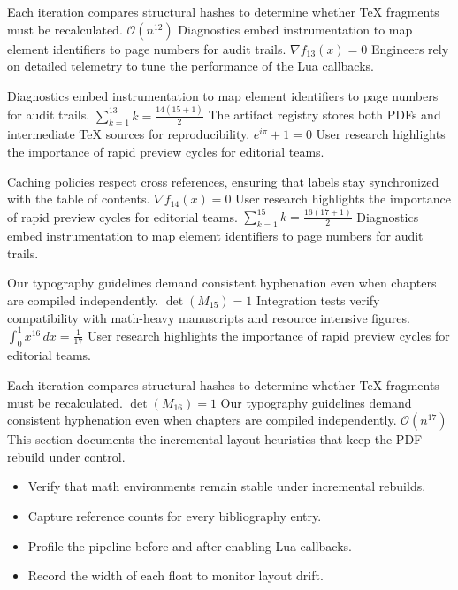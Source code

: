 \documentclass[12pt,a4paper,twocolumn]{article}
\newcommand{\paraid}[1]{\par\noindent\hypertarget{#1}{\ignorespaces}}
\begin{document}
\paraid{sec9-p3}Each iteration compares structural hashes to determine whether TeX fragments must be recalculated. $\mathcal{O}(n^{12})$ Diagnostics embed instrumentation to map element identifiers to page numbers for audit trails. $\nabla f_{13}(x) = 0$ Engineers rely on detailed telemetry to tune the performance of the Lua callbacks.
\par

\paraid{sec9-p4}Diagnostics embed instrumentation to map element identifiers to page numbers for audit trails. $\sum_{k=1}^{13} k = \frac{14(15+1)}{2}$ The artifact registry stores both PDFs and intermediate TeX sources for reproducibility. $e^{i\pi} + 1 = 0$ User research highlights the importance of rapid preview cycles for editorial teams.
\par

\paraid{sec9-p5}Caching policies respect cross references, ensuring that labels stay synchronized with the table of contents. $\nabla f_{14}(x) = 0$ User research highlights the importance of rapid preview cycles for editorial teams. $\sum_{k=1}^{15} k = \frac{16(17+1)}{2}$ Diagnostics embed instrumentation to map element identifiers to page numbers for audit trails.
\par

\paraid{sec9-p6}Our typography guidelines demand consistent hyphenation even when chapters are compiled independently. $\det(M_{15}) = 1$ Integration tests verify compatibility with math-heavy manuscripts and resource intensive figures. $\int_{0}^{1} x^{16} \, dx = \frac{1}{17}$ User research highlights the importance of rapid preview cycles for editorial teams.
\par

\paraid{sec9-p7}Each iteration compares structural hashes to determine whether TeX fragments must be recalculated. $\det(M_{16}) = 1$ Our typography guidelines demand consistent hyphenation even when chapters are compiled independently. $\mathcal{O}(n^{17})$ This section documents the incremental layout heuristics that keep the PDF rebuild under control.
\par

\begin{itemize}

\item 
        Verify that math environments remain stable under incremental rebuilds.
      

\item 
        Capture reference counts for every bibliography entry.
      

\item 
        Profile the pipeline before and after enabling Lua callbacks.
      

\item 
        Record the width of each float to monitor layout drift.
      

\end{itemize}
\end{document}
